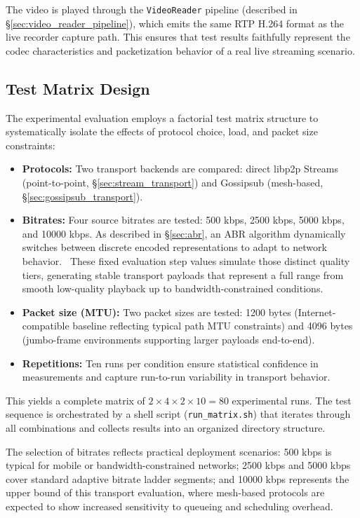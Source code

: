 The video is played through the \texttt{VideoReader} pipeline (described in \S\ref{sec:video_reader_pipeline}), which emits the same \ac{RTP} H.264 format as the live recorder capture path.
This ensures that test results faithfully represent the codec characteristics and packetization behavior of a real live streaming scenario.

\subsection{Test Matrix Design}
\label{sec:test_matrix}
The experimental evaluation employs a factorial test matrix structure to systematically isolate the effects of protocol choice, load, and packet size constraints:

\begin{itemize}
    \item \textbf{Protocols:} Two transport backends are compared: direct libp2p Streams (point-to-point, \S\ref{sec:stream_transport}) and Gossipsub (mesh-based, \S\ref{sec:gossipsub_transport}).
    \item \textbf{Bitrates:} Four source bitrates are tested: 500 kbps, 2500 kbps, 5000 kbps, and 10000 kbps. As described in \S\ref{sec:abr}, an \ac{ABR} algorithm dynamically switches between discrete encoded representations to adapt to network behavior.~\cite{peroniEndtoEndPipelinePerspective2025} These fixed evaluation step values simulate those distinct quality tiers, generating stable transport payloads that represent a full range from smooth low-quality playback up to bandwidth-constrained conditions.
    \item \textbf{Packet size (\ac{MTU}):} Two packet sizes are tested: 1200 bytes (Internet-compatible baseline reflecting typical path \ac{MTU} constraints) and 4096 bytes (jumbo-frame environments supporting larger payloads end-to-end).
    \item \textbf{Repetitions:} Ten runs per condition ensure statistical confidence in measurements and capture run-to-run variability in transport behavior.
\end{itemize}

This yields a complete matrix of $2 \times 4 \times 2 \times 10 = 80$ experimental runs. The test sequence is orchestrated by a shell script (\texttt{run\_matrix.sh}) that iterates through all combinations and collects results into an organized directory structure.

The selection of bitrates reflects practical deployment scenarios: 500 kbps is typical for mobile or bandwidth-constrained networks; 2500 kbps and 5000 kbps cover standard adaptive bitrate ladder segments; and 10000 kbps represents the upper bound of this transport evaluation, where mesh-based protocols are expected to show increased sensitivity to queueing and scheduling overhead.


